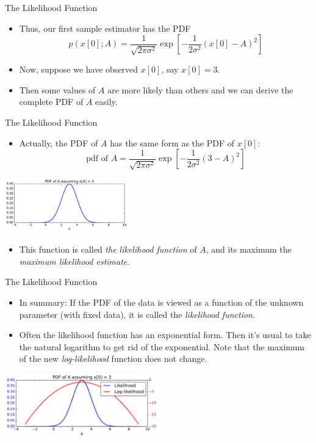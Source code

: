 \documentclass[10pt, aspectratio=169]{beamer} %
\begin{document}
\begin{frame}[allowframebreaks=0.8]{The Likelihood Function}
\begin{itemize}
\item Thus, our first sample estimator has the PDF
\[
p(x[0]; A) = \frac{1}{\sqrt{2\pi\sigma^2}}\exp\left[{-\frac{1}{2\sigma^2}(x[0]-A)^2}\right]
\]
\item Now, suppose we have observed $x[0]$, say $x[0] = 3$.
\item Then some values of $A$ are more likely than others
and we can derive the complete PDF of $A$ easily.
\end{itemize}
\end{frame}

\begin{frame}[allowframebreaks=0.8]{The Likelihood Function}
\begin{itemize}
\item Actually, the PDF of $A$ has the same form as the PDF of $x[0]$:
\[
\text{pdf of } A = \frac{1}{\sqrt{2\pi\sigma^2}}\exp\left[{-\frac{1}{2\sigma^2}(3-A)^2}\right]
\]
\end{itemize}
\centerline{\includegraphics[width=0.4\textwidth]{PDF_A.pdf}}
\begin{itemize}
\item This function is called \emph{the likelihood function} of $A$, and its maximum
the \emph{maximum likelihood estimate}.
\end{itemize}
\end{frame}

\begin{frame}[allowframebreaks=0.8]{The Likelihood Function}
\begin{itemize}
\item In summary: If the PDF of the data is viewed as a function of the unknown 
parameter (with fixed data), it is called the \emph{likelihood function}.
\item Often the likelihood function has an exponential form. Then it's usual to
take the natural logarithm to get rid of the exponential. Note that the maximum of
the new \emph{log-likelihood} function does not change.
\end{itemize}
\centerline{\includegraphics[width=0.5\textwidth]{PDF_A_LL.pdf}}
\end{frame}
\end{document}
